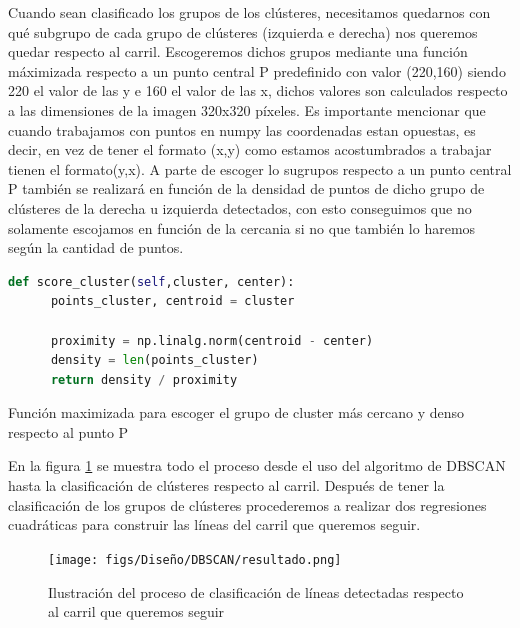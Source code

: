 Cuando sean clasificado los grupos de los clústeres, necesitamos quedarnos con qué subgrupo de cada grupo de clústeres (izquierda e derecha) nos queremos quedar respecto al carril. Escogeremos dichos grupos mediante una función máximizada
respecto a un punto central P predefinido con valor (220,160) siendo 220 el valor de las y e 160 el valor de las x, dichos valores son calculados respecto 
a las dimensiones de la imagen 320x320 píxeles. Es importante mencionar que cuando trabajamos con puntos en numpy las coordenadas estan opuestas, es decir, en vez de tener el formato (x,y) como estamos acostumbrados a trabajar tienen el formato(y,x). 
A parte de escoger lo sugrupos respecto a un punto central P también se realizará en función de la densidad de puntos de dicho grupo de clústeres de la derecha u izquierda detectados, con
esto conseguimos que no solamente escojamos en función de la cercania si no que también lo haremos según la cantidad de puntos. \newline

\begin{code}[h]
  \begin{lstlisting}[language=Python]
    def score_cluster(self,cluster, center):
      points_cluster, centroid = cluster
    
      proximity = np.linalg.norm(centroid - center)
      density = len(points_cluster)
      return density / proximity

  \end{lstlisting}
  \caption[Función maximizada para escoger el grupo de cluster más cercano y denso respecto al punto P]{Función maximizada para escoger el grupo de cluster más cercano y denso respecto al punto P}
  \label{cod:codejemplo}
  \end{code}  

  En la figura \ref{fig:DBSCAN_imagen} se muestra todo el proceso desde el uso del algoritmo de DBSCAN hasta la clasificación de clústeres respecto al carril. 
  Después de tener la clasificación de los grupos de clústeres procederemos a realizar dos regresiones cuadráticas para construir las líneas del carril que queremos seguir.

\begin{figure} [H]
  \begin{center}
    \texttt{[image: figs/Diseño/DBSCAN/resultado.png]}
  \end{center}
  \caption{Ilustración del proceso de clasificación de líneas detectadas respecto al carril que queremos seguir}
  \label{fig:DBSCAN_imagen}
\end{figure}\


